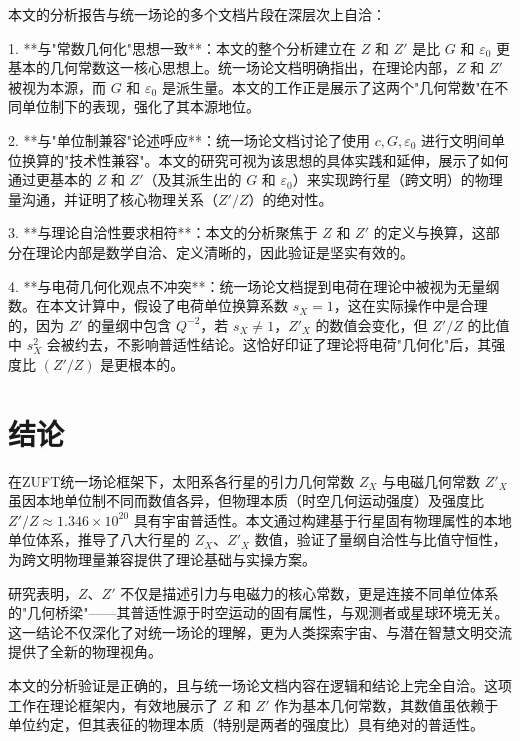 \documentclass[a4paper, 12pt]{article}
\begin{document}
本文的分析报告与统一场论的多个文档片段在深层次上自洽：

1. **与"常数几何化"思想一致**：本文的整个分析建立在 $Z$ 和 $Z'$ 是比 $G$ 和 $\varepsilon_0$ 更基本的几何常数这一核心思想上。统一场论文档明确指出，在理论内部，$Z$ 和 $Z'$ 被视为本源，而 $G$ 和 $\varepsilon_0$ 是派生量。本文的工作正是展示了这两个"几何常数"在不同单位制下的表现，强化了其本源地位。

2. **与"单位制兼容"论述呼应**：统一场论文档讨论了使用 $c, G, \varepsilon_0$ 进行文明间单位换算的"技术性兼容"。本文的研究可视为该思想的具体实践和延伸，展示了如何通过更基本的 $Z$ 和 $Z'$（及其派生出的 $G$ 和 $\varepsilon_0$）来实现跨行星（跨文明）的物理量沟通，并证明了核心物理关系（$Z'/Z$）的绝对性。

3. **与理论自洽性要求相符**：本文的分析聚焦于 $Z$ 和 $Z'$ 的定义与换算，这部分在理论内部是数学自洽、定义清晰的，因此验证是坚实有效的。

4. **与电荷几何化观点不冲突**：统一场论文档提到电荷在理论中被视为无量纲数。在本文计算中，假设了电荷单位换算系数 $s_X = 1$，这在实际操作中是合理的，因为 $Z'$ 的量纲中包含 $Q^{-2}$，若 $s_X \neq 1$，$Z'_X$ 的数值会变化，但 $Z'/Z$ 的比值中 $s_X^2$ 会被约去，不影响普适性结论。这恰好印证了理论将电荷"几何化"后，其强度比 $(Z'/Z)$ 是更根本的。

\section{结论}
在ZUFT统一场论框架下，太阳系各行星的引力几何常数 $Z_X$ 与电磁几何常数 $Z'_X$ 虽因本地单位制不同而数值各异，但物理本质（时空几何运动强度）及强度比 $Z'/Z \approx 1.346 \times 10^{20}$ 具有宇宙普适性。本文通过构建基于行星固有物理属性的本地单位体系，推导了八大行星的 $Z_X$、$Z'_X$ 数值，验证了量纲自洽性与比值守恒性，为跨文明物理量兼容提供了理论基础与实操方案。

研究表明，$Z$、$Z'$ 不仅是描述引力与电磁力的核心常数，更是连接不同单位体系的"几何桥梁"——其普适性源于时空运动的固有属性，与观测者或星球环境无关。这一结论不仅深化了对统一场论的理解，更为人类探索宇宙、与潜在智慧文明交流提供了全新的物理视角。

本文的分析验证是正确的，且与统一场论文档内容在逻辑和结论上完全自洽。这项工作在理论框架内，有效地展示了 $Z$ 和 $Z'$ 作为基本几何常数，其数值虽依赖于单位约定，但其表征的物理本质（特别是两者的强度比）具有绝对的普适性。



\end{document}
